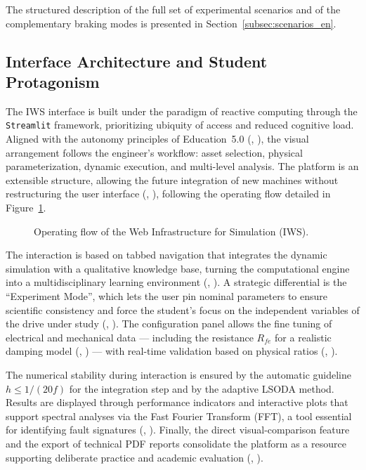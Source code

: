 \documentclass[a4paper]{ifacconf}
\begin{document}
The structured description of the full set of experimental scenarios and of the complementary braking modes is presented in Section~\ref{subsec:scenarios_en}.

\subsection{Interface Architecture and Student Protagonism}

The IWS interface is built under the paradigm of reactive computing through the \texttt{Streamlit} framework, prioritizing ubiquity of access and reduced cognitive load. Aligned with the autonomy principles of Education~5.0 (\citeauthor{cordeiro2024educacao}, \citeyear{cordeiro2024educacao}), the visual arrangement follows the engineer's workflow: asset selection, physical parameterization, dynamic execution, and multi-level analysis. The platform is an extensible structure, allowing the future integration of new machines without restructuring the user interface (\citeauthor{leedy2013simulink}, \citeyear{leedy2013simulink}), following the operating flow detailed in Figure~\ref{fig:fluxo_ems_en}.

\begin{figure}[htbp]
  \centering
  \resizebox{0.48\textwidth}{!}{
    
  }
  \caption{Operating flow of the Web Infrastructure for Simulation (IWS).}
  \label{fig:fluxo_ems_en}
\end{figure}

The interaction is based on tabbed navigation that integrates the dynamic simulation with a qualitative knowledge base, turning the computational engine into a multidisciplinary learning environment (\citeauthor{souza2011ambiente}, \citeyear{souza2011ambiente}). A strategic differential is the ``Experiment Mode'', which lets the user pin nominal parameters to ensure scientific consistency and force the student's focus on the independent variables of the drive under study (\citeauthor{tuanmohamad2024advance}, \citeyear{tuanmohamad2024advance}). The configuration panel allows the fine tuning of electrical and mechanical data --- including the resistance $R_{fe}$ for a realistic damping model (\citeauthor{kumari2025comparative}, \citeyear{kumari2025comparative}) --- with real-time validation based on physical ratios (\citeauthor{karakas2009aggregation}, \citeyear{karakas2009aggregation}).

The numerical stability during interaction is ensured by the automatic guideline $h \leq 1/(20f)$ for the integration step and by the adaptive LSODA method. Results are displayed through performance indicators and interactive plots that support spectral analyses via the Fast Fourier Transform (FFT), a tool essential for identifying fault signatures (\citeauthor{arkan2005modelling}, \citeyear{arkan2005modelling}). Finally, the direct visual-comparison feature and the export of technical PDF reports consolidate the platform as a resource supporting deliberate practice and academic evaluation (\citeauthor{singh2019improving}, \citeyear{singh2019improving}).
\end{document}
